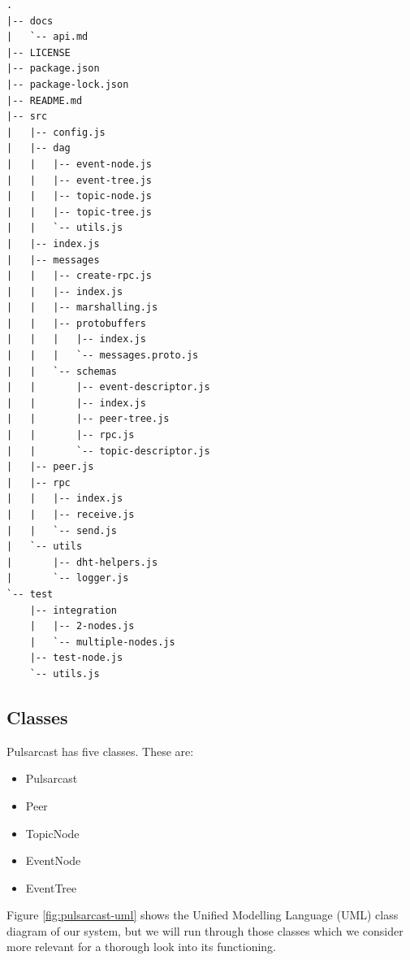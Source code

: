 \begin{lstlisting}[float, caption={File tree for our Pulsarcast implementation},label={file-tree}]
.
|-- docs
|   `-- api.md
|-- LICENSE
|-- package.json
|-- package-lock.json
|-- README.md
|-- src
|   |-- config.js
|   |-- dag
|   |   |-- event-node.js
|   |   |-- event-tree.js
|   |   |-- topic-node.js
|   |   |-- topic-tree.js
|   |   `-- utils.js
|   |-- index.js
|   |-- messages
|   |   |-- create-rpc.js
|   |   |-- index.js
|   |   |-- marshalling.js
|   |   |-- protobuffers
|   |   |   |-- index.js
|   |   |   `-- messages.proto.js
|   |   `-- schemas
|   |       |-- event-descriptor.js
|   |       |-- index.js
|   |       |-- peer-tree.js
|   |       |-- rpc.js
|   |       `-- topic-descriptor.js
|   |-- peer.js
|   |-- rpc
|   |   |-- index.js
|   |   |-- receive.js
|   |   `-- send.js
|   `-- utils
|       |-- dht-helpers.js
|       `-- logger.js
`-- test
    |-- integration
    |   |-- 2-nodes.js
    |   `-- multiple-nodes.js
    |-- test-node.js
    `-- utils.js

\end{lstlisting}

\subsection{Classes}\label{subsec:classes}

Pulsarcast has five classes. These are:

\begin{itemize}
  \item
    Pulsarcast
  \item
		Peer
  \item
    TopicNode
  \item
    EventNode
  \item
    EventTree
\end{itemize}

Figure \ref{fig:pulsarcast-uml} shows the Unified Modelling Language  (UML)
class diagram of our system, but we will run through those classes which we
consider more relevant for a thorough look into its functioning.

